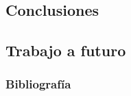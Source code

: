 \documentclass{beamer}
\theoremstyle{definition}
\begin{document}
\subsection{Conclusiones}

\subsection{Trabajo a futuro}


\begin{frame}[allowframebreaks]
\frametitle{Bibliograf\'ia}
\footnotesize{
%
{}
%

}
\end{frame}
\end{document}
